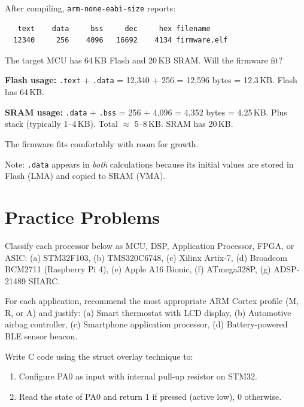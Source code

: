 \begin{example}
After compiling, \texttt{arm-none-eabi-size} reports:
\begin{verbatim}
   text    data     bss     dec     hex filename
  12340     256    4096   16692    4134 firmware.elf
\end{verbatim}
The target MCU has 64\,KB Flash and 20\,KB SRAM. Will the firmware fit?

\begin{solution}
\textbf{Flash usage:} \texttt{.text} + \texttt{.data} = 12{,}340 + 256 = 12{,}596 bytes = 12.3\,KB. Flash has 64\,KB. \checkmark

\textbf{SRAM usage:} \texttt{.data} + \texttt{.bss} = 256 + 4{,}096 = 4{,}352 bytes = 4.25\,KB. Plus stack (typically 1--4\,KB). Total $\approx$ 5--8\,KB. SRAM has 20\,KB. \checkmark

The firmware fits comfortably with room for growth.

Note: \texttt{.data} appears in \emph{both} calculations because its initial values are stored in Flash (LMA) and copied to SRAM (VMA).
\end{solution}
\end{example}

\section{Practice Problems}
\label{sec:proc:practice}

\begin{exercise}
Classify each processor below as MCU, DSP, Application Processor, FPGA, or ASIC: (a) STM32F103, (b) TMS320C6748, (c) Xilinx Artix-7, (d) Broadcom BCM2711 (Raspberry Pi 4), (e) Apple A16 Bionic, (f) ATmega328P, (g) ADSP-21489 SHARC.
\end{exercise}

\begin{exercise}
For each application, recommend the most appropriate ARM Cortex profile (M, R, or A) and justify: (a) Smart thermostat with LCD display, (b) Automotive airbag controller, (c) Smartphone application processor, (d) Battery-powered BLE sensor beacon.
\end{exercise}

\begin{exercise}
Write C code using the struct overlay technique to:
\begin{enumerate}[label=(\alph*)]
  \item Configure PA0 as input with internal pull-up resistor on STM32.
  \item Read the state of PA0 and return 1 if pressed (active low), 0 otherwise.
\end{enumerate}
\end{exercise}

